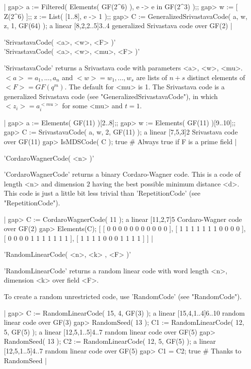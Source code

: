 |    gap> a := Filtered( Elements( GF(2^6) ), e -> e in GF(2^3) );;
    gap> w := [ Z(2^6) ];; z := List( [1..8], e -> 1 );;
    gap> C := GeneralizedSrivastavaCode( a, w, z, 1, GF(64) );
    a linear [8,2,2..5]3..4 generalized Srivastava code over GF(2) |


'SrivastavaCode( <a>, <w>, <F> )'\\
'SrivastavaCode( <a>, <w>, <mu>, <F> )'

'SrivastavaCode' returns a    Srivastava code with parameters  <a>,  <w>,
<mu>. $<a> = a_1, ..., a_n$ and $<w> = w_1,  ..., w_s$ are lists of $n+s$
distinct elements   of  $<F>=GF(q^m)$. The default  for  <mu>   is 1. The
Srivastava  code      is      a generalized    Srivastava     code   (see
"GeneralizedSrivastavaCode"), in which $<z_i> = a_i^{<mu>}$ for some <mu>
and $t=1$.

|    gap> a := Elements( GF(11) ){[2..8]};;
    gap> w := Elements( GF(11) ){[9..10]};;
    gap> C := SrivastavaCode( a, w, 2, GF(11) );
    a linear [7,5,3]2 Srivastava code over GF(11)
    gap> IsMDSCode( C );
    true    # Always true if F is a prime field |


'CordaroWagnerCode( <n> )'

'CordaroWagnerCode' returns a binary Cordaro-Wagner code.  This is a code
of length <n> and dimension $2$ having the best possible minimum distance
<d>.  This code is  just a little  bit less trivial than 'RepetitionCode'
(see "RepetitionCode").

|    gap> C := CordaroWagnerCode( 11 );
    a linear [11,2,7]5 Cordaro-Wagner code over GF(2)
    gap> Elements(C);
    [ [ 0 0 0 0 0 0 0 0 0 0 0 ], [ 1 1 1 1 1 1 1 0 0 0 0 ],
      [ 0 0 0 0 1 1 1 1 1 1 1 ], [ 1 1 1 1 0 0 0 1 1 1 1 ] ] |


'RandomLinearCode( <n>, <k> , <F> )'

'RandomLinearCode'  returns  a random linear  code  with word length <n>,
dimension <k> over field <F>.

To   create a    random  unrestricted   code,   use 'RandomCode'     (see
"RandomCode").

|    gap> C := RandomLinearCode( 15, 4, GF(3) );
    a linear [15,4,1..4]6..10 random linear code over GF(3)
    gap> RandomSeed( 13 ); C1 := RandomLinearCode( 12, 5, GF(5) );
    a linear [12,5,1..5]4..7 random linear code over GF(5)
    gap> RandomSeed( 13 ); C2 := RandomLinearCode( 12, 5, GF(5) );
    a linear [12,5,1..5]4..7 random linear code over GF(5)
    gap> C1 = C2;
    true    # Thanks to RandomSeed |

